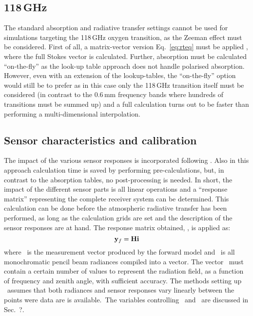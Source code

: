 \subsection{118\,GHz}
%
The standard absorption and radiative transfer settings cannot be used for
simulations targeting the 118\,GHz oxygen transition, as the Zeeman effect must
be considered. First of all, a matrix-vector version Eq.~\ref{eq:rteq} must be
applied \citep{larsson:zeema:14}, where the full Stokes vector is calculated.
Further, absorption must be calculated ``on-the-fly'' as the look-up table
approach does not handle polarised absorption. However, even with an extension
of the lookup-tables, the ``on-the-fly'' option would still be to prefer as in
this case only the 118\,GHz transition itself must be considered (in contrast
to the 0.6\,mm frequency bands where hundreds of transitions must be summed
up) and a full calculation turns out to be faster than performing a
multi-dimensional interpolation.


\subsection{Sensor characteristics and calibration}
%
The impact of the various sensor responses is incorporated following
\citet{eriksson:06}. Also in this approach calculation time is saved by
performing pre-calculations, but, in contrast to the absorption tables, no
post-processing is needed. In short, the impact of the different sensor parts
is all linear operations and a ``response matrix'' representing the complete
receiver system can be determined. This calculation can be done before the
atmospheric radiative transfer has been performed, as long as the calculation
grids are set and the description of the sensor responses are at hand. The
response matrix obtained, \SnsMtr, is applied as:
\begin{equation}
  \label{eq:H}
  \mathbf{y}_{f} = \mathbf{H}\mathbf{i}
\end{equation}
where \ is the measurement vector produced by the forward
model and \MpiVct\ is all monochromatic pencil beam radiances compiled into a
vector. The vector \MpiVct\ must contain a certain number of values to
represent the radiation field, as a function of frequency and zenith angle,
with sufficient accuracy. The methods setting up \SnsMtr\ assumes that both
radiances and sensor responses vary linearly between the points were data are is available.\ The variables controlling
\SnsMtr\ and \MpiVct\ are discussed in Sec.~?.

